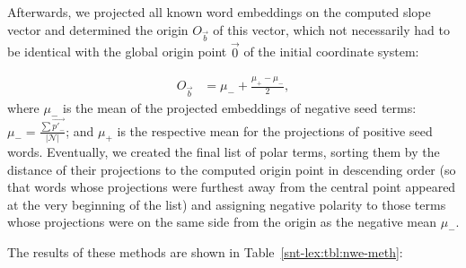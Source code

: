 Afterwards, we projected all known word embeddings on the computed
slope vector and determined the origin $O_{\vec{b}}$ of this vector,
which not necessarily had to be identical with the global origin point
$\vec{0}$ of the initial coordinate system:

{\small%
  \begin{align}
    O_{\vec{b}} &= \mu_- + \frac{\mu_+ - \mu_-}{2},
\end{align}\normalsize}%
where $\mu_-$ is the mean of the projected embeddings of negative seed
terms: $\mu_- = \frac{\sum\vec{p'_-}}{|\mathcal{N}|}$; and $\mu_+$ is
the respective mean for the projections of positive seed words.
Eventually, we created the final list of polar terms, sorting them by
the distance of their projections to the computed origin point in
descending order (so that words whose projections were furthest away
from the central point appeared at the very beginning of the list) and
assigning negative polarity to those terms whose projections were on
the same side from the origin as the negative mean $\mu_-$.

The results of these methods are shown in
Table~\ref{snt-lex:tbl:nwe-meth}:

